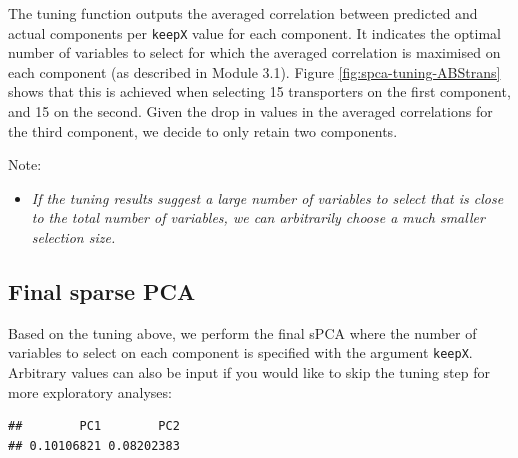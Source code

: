 \documentclass[]{book}
\newenvironment{Shaded}{\begin{snugshade}}{\end{snugshade}}
\newcommand{\CommentTok}[1]{\textcolor[rgb]{0.56,0.35,0.01}{\textit{#1}}}
\newcommand{\DataTypeTok}[1]{\textcolor[rgb]{0.13,0.29,0.53}{#1}}
\newcommand{\DecValTok}[1]{\textcolor[rgb]{0.00,0.00,0.81}{#1}}
\newcommand{\KeywordTok}[1]{\textcolor[rgb]{0.13,0.29,0.53}{\textbf{#1}}}
\newcommand{\NormalTok}[1]{#1}
\newcommand{\OperatorTok}[1]{\textcolor[rgb]{0.81,0.36,0.00}{\textbf{#1}}}
\newcommand{\StringTok}[1]{\textcolor[rgb]{0.31,0.60,0.02}{#1}}
\providecommand{\tightlist}{%
  \setlength{\itemsep}{0pt}\setlength{\parskip}{0pt}}
\begin{document}
The tuning function outputs the averaged correlation between predicted and actual components per \texttt{keepX} value for each component. It indicates the optimal number of variables to select for which the averaged correlation is maximised on each component (as described in Module 3.1). Figure \ref{fig:spca-tuning-ABStrans} shows that this is achieved when selecting 15 transporters on the first component, and 15 on the second. Given the drop in values in the averaged correlations for the third component, we decide to only retain two components.

Note:

\begin{itemize}
\tightlist
\item
  \emph{If the tuning results suggest a large number of variables to select that is close to the total number of variables, we can arbitrarily choose a much smaller selection size.}
\end{itemize}

\hypertarget{final-sparse-pca}{%
\subsection{Final sparse PCA}\label{final-sparse-pca}}

Based on the tuning above, we perform the final sPCA where the number of variables to select on each component is specified with the argument \texttt{keepX}. Arbitrary values can also be input if you would like to skip the tuning step for more exploratory analyses:

\begin{Shaded}
\end{Shaded}

\begin{verbatim}
##        PC1        PC2 
## 0.10106821 0.08202383
\end{verbatim}
\end{document}
